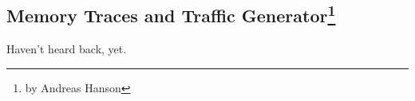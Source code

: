\subsection[Memory Traces and Traffic Generator]{Memory Traces and Traffic Generator\footnote{by Andreas Hanson}}

Haven't heard back, yet.
